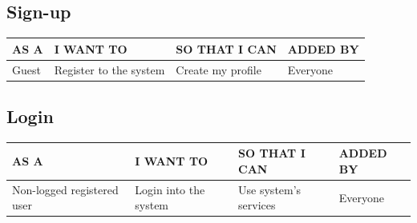 \documentclass[11pt, a4paper]{article}
\begin{document}
\subsection{Sign-up}
\begin{table}[H]
    \centering
    \begin{tabular}{|p{4cm}|p{4cm}|p{4cm}|p{4cm}|}
    \hline
    \rowcolor[HTML]{EFEFEF} 
    AS A  & I WANT TO              & SO THAT I CAN     & ADDED BY \\ \hline
    Guest & Register to the system & Create my profile & Everyone \\ \hline
    \end{tabular}
\end{table}
\begin{figure}[H]
    \centering
\end{figure}

\subsection{Login}
\begin{table}[H]
    \centering
    \begin{tabular}{|p{4.5cm}|p{4cm}|p{4cm}|p{4cm}|}
    \hline
    \rowcolor[HTML]{EFEFEF} 
    AS A                       & I WANT TO             & SO THAT I CAN         & ADDED BY \\ \hline
    Non-logged registered user & Login into the system & Use system's services & Everyone \\ \hline
    \end{tabular}
\end{table}
\begin{figure}[H]
    \centering
\end{figure}
\end{document}
